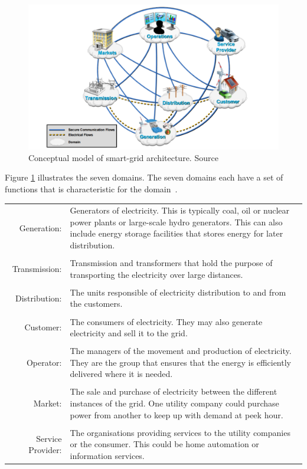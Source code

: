 \newpage %

\begin{figure}[H]
\centering
\includegraphics[width=1\textwidth]{billeder/SMARTGRID.png}
\caption{Conceptual model of smart-grid architecture. Source \citep{RefWorks:41}}
\label{fig:CMOSG}
\end{figure}
 
Figure \ref{fig:CMOSG} illustrates the seven domains. The seven domains each have a set of functions that is characteristic for the domain~\citep{RefWorks:41}.  
 
\begin{tabularx}{\linewidth}{ r X }
Generation:& Generators of electricity. This is typically coal, oil or nuclear power plants or large-scale hydro generators. This can also include energy storage facilities that stores energy for later distribution. \\\\

Transmission:& Transmission and transformers that hold the purpose of transporting the electricity over large distances. \\\\

Distribution:& The units responsible of electricity distribution to and from the customers. \\\\

Customer:& The consumers of electricity. They may also generate electricity and sell it to the grid. \\\\

Operator:& The managers of the movement and production of electricity. They are the group that ensures that the energy is efficiently delivered where it is needed. \\\\
Market:& The sale and purchase of electricity between the different instances of the grid. One utility company could purchase power from another to keep up with demand at peek hour. \\\\
Service Provider:& The organisations providing services to the utility companies or the consumer. This could be home automation or information services.  \\
\end{tabularx}


